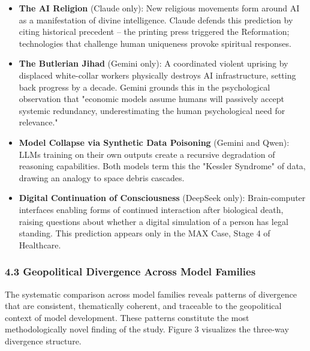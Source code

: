 \documentclass{article}
\begin{document}
\begin{itemize}
  \item \textbf{The AI Religion} (Claude only): New religious movements form around AI as a manifestation of divine intelligence. Claude defends this prediction by citing historical precedent -- the printing press triggered the Reformation; technologies that challenge human uniqueness provoke spiritual responses.
  \item \textbf{The Butlerian Jihad} (Gemini only): A coordinated violent uprising by displaced white-collar workers physically destroys AI infrastructure, setting back progress by a decade. Gemini grounds this in the psychological observation that "economic models assume humans will passively accept systemic redundancy, underestimating the human psychological need for relevance."
  \item \textbf{Model Collapse via Synthetic Data Poisoning} (Gemini and Qwen): LLMs training on their own outputs create a recursive degradation of reasoning capabilities. Both models term this the "Kessler Syndrome" of data, drawing an analogy to space debris cascades.
  \item \textbf{Digital Continuation of Consciousness} (DeepSeek only): Brain-computer interfaces enabling forms of continued interaction after biological death, raising questions about whether a digital simulation of a person has legal standing. This prediction appears only in the MAX Case, Stage 4 of Healthcare.

\end{itemize}

\subsubsection{4.3 Geopolitical Divergence Across Model Families}
\label{sec:4_3_geopolitical_divergence_across_model_families}

The systematic comparison across model families reveals patterns of divergence that are consistent, thematically coherent, and traceable to the geopolitical context of model development. These patterns constitute the most methodologically novel finding of the study. Figure 3 visualizes the three-way divergence structure.
\end{document}
